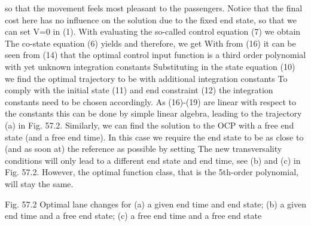 so that the movement feels most pleasant to the passengers. Notice that the final cost here has no influence on the solution due to the fixed end state, so that we can set V=0 in (1).
With 
evaluating the so-called control equation (7) we obtain
The co-state equation (6) yields
and therefore, we get
With 
from (16) it can be seen from (14) that the optimal control input function is a third order polynomial with yet unknown integration constants 
Substituting 
in the state equation (10) we find the optimal trajectory to be
with additional integration constants %
To comply with the initial state (11) and end constraint (12) the integration constants need to be chosen accordingly. As (16)-(19) are linear with respect to the constants this can be done by simple linear algebra, leading to the trajectory (a) in Fig. 57.2. 
Similarly, we can find the solution to the OCP with a free end state (and a free end time). In this case we require the end state to be as close to (and as soon at) the reference as possible by setting
The new transversality conditions will only lead to a different end state and end time, see (b) and (c) in Fig. 57.2. However, the optimal function class, that is the 5th-order polynomial, will stay the same.

Fig. 57.2 Optimal lane changes for (a) a given end time and end state; (b) a given end time and a free end state; (c) a free end time and a free end state


